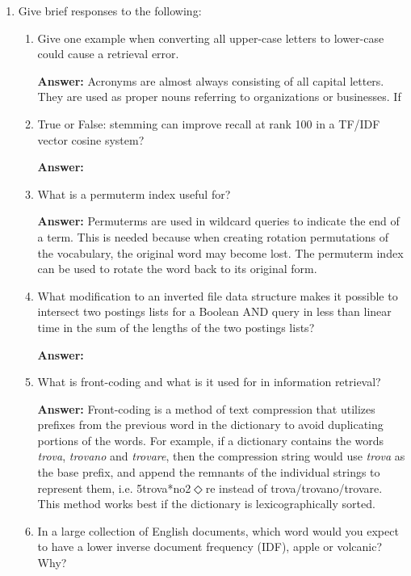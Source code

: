 \documentclass[11pt]{article}
\begin{document}
\begin{enumerate}
\begin{enumerate}
        \end{enumerate}

  \item Give brief responses to the following:
        \begin{enumerate}
          \item Give one example when converting all upper-case letters to lower-case could cause a retrieval error.

                \textbf{Answer:} Acronyms are almost always consisting of all capital letters. They are used as proper nouns referring to organizations or businesses. If

          \item True or False: stemming can improve recall at rank 100 in a TF/IDF vector cosine system?

                \textbf{Answer:}

          \item What is a permuterm index useful for?

                \textbf{Answer:} Permuterms are used in wildcard queries to indicate the end of a term. This is needed because when creating rotation permutations of the vocabulary, the original word may become lost. The permuterm index can be used to rotate the word back to its original form.

          \item What modification to an inverted file data structure makes it possible to intersect two postings lists for a Boolean AND query in less than linear time in the sum of the lengths of the two postings lists?

                \textbf{Answer:}

          \item What is front-coding and what is it used for in information retrieval?

                \textbf{Answer:} Front-coding is a method of text compression that utilizes prefixes from the previous word in the dictionary to avoid duplicating portions of the words. For example, if a dictionary contains the words \textit{trova}, \textit{trovano} and \textit{trovare}, then the compression string would use \textit{trova} as the base prefix, and append the remnants of the individual strings to represent them, i.e. 5trova*no2$\Diamond$re instead of trova/trovano/trovare. This method works best if the dictionary is lexicographically sorted.

          \item In a large collection of English documents, which word would you expect to have a lower inverse document frequency (IDF), apple or volcanic? Why?


\end{enumerate}
\end{enumerate}
\end{document}
